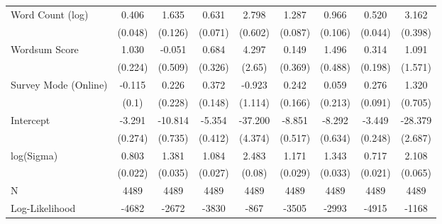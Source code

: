 \begin{table}[ht]
\begin{tabular}{lcccccccc}
  Word Count (log) &  0.406 &   1.635 &  0.631 &   2.798 &  1.287 &  0.966 &  0.520 &   3.162 \\ 
   & (0.048) & (0.126) & (0.071) & (0.602) & (0.087) & (0.106) & (0.044) & (0.398) \\ 
  Wordsum Score &  1.030 &  -0.051 &  0.684 &   4.297 &  0.149 &  1.496 &  0.314 &   1.091 \\ 
   & (0.224) & (0.509) & (0.326) & (2.65) & (0.369) & (0.488) & (0.198) & (1.571) \\ 
  Survey Mode (Online) & -0.115 &   0.226 &  0.372 &  -0.923 &  0.242 &  0.059 &  0.276 &   1.320 \\ 
   & (0.1) & (0.228) & (0.148) & (1.114) & (0.166) & (0.213) & (0.091) & (0.705) \\ 
  Intercept & -3.291 & -10.814 & -5.354 & -37.200 & -8.851 & -8.292 & -3.449 & -28.379 \\ 
   & (0.274) & (0.735) & (0.412) & (4.374) & (0.517) & (0.634) & (0.248) & (2.687) \\ 
  log(Sigma) &  0.803 &   1.381 &  1.084 &   2.483 &  1.171 &  1.343 &  0.717 &   2.108 \\ 
   & (0.022) & (0.035) & (0.027) & (0.08) & (0.029) & (0.033) & (0.021) & (0.065) \\ 
   \hline
N & 4489 & 4489 & 4489 & 4489 & 4489 & 4489 & 4489 & 4489 \\ 
  Log-Likelihood & -4682 & -2672 & -3830 & -867 & -3505 & -2993 & -4915 & -1168 \\ 
   \hline
\end{tabular}
\endgroup
\end{table}
